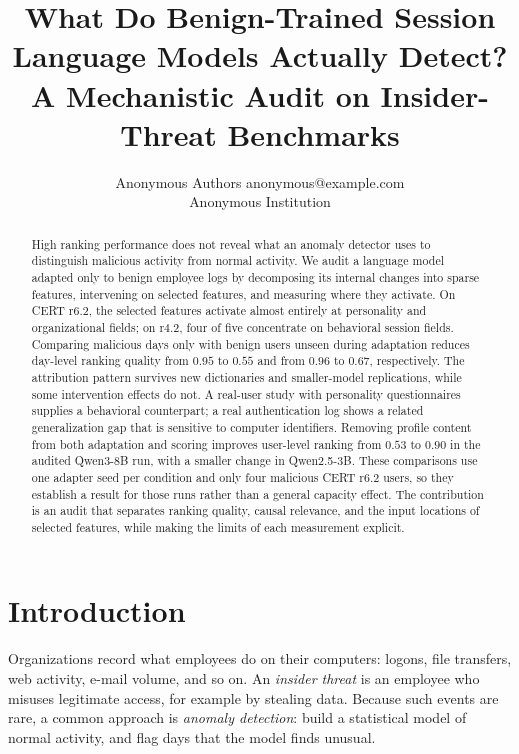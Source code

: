 \documentclass[10pt]{article} %
\title{What Do Benign-Trained Session Language Models Actually Detect? \\ A Mechanistic Audit on Insider-Threat Benchmarks}
\author{\name Anonymous Authors \email anonymous@example.com \\
\addr Anonymous Institution}
\begin{document}
\maketitle


\begin{abstract}
High ranking performance does not reveal what an anomaly detector uses
to distinguish malicious activity from normal activity. We audit a language
model adapted only to benign employee logs by decomposing its internal
changes into sparse features, intervening on selected features, and
measuring where they activate. On CERT r6.2, the selected features activate
almost entirely at personality and organizational fields; on r4.2, four of
five concentrate on behavioral session fields. Comparing malicious days
only with benign users unseen during adaptation reduces day-level ranking
quality from $0.95$ to $0.55$ and from $0.96$ to $0.67$, respectively.
The attribution pattern survives new dictionaries and smaller-model
replications, while some intervention effects do not. A real-user study
with personality questionnaires supplies a behavioral counterpart; a real
authentication log shows a related generalization gap that is sensitive
to computer identifiers. Removing profile content from both adaptation
and scoring improves user-level ranking from $0.53$ to $0.90$ in the
audited Qwen3-8B run, with a smaller change in Qwen2.5-3B. These comparisons
use one adapter seed per condition and only four malicious CERT r6.2
users, so they establish a result for those runs rather than a general
capacity effect. The contribution is an audit that separates ranking
quality, causal relevance, and the input locations of selected features,
while making the limits of each measurement explicit.
\end{abstract}

\section{Introduction}
\label{sec:intro}

Organizations record what employees do on their computers: logons, file
transfers, web activity, e-mail volume, and so on. An \emph{insider
threat} is an employee who misuses legitimate access, for example by
stealing data. Because such events are rare, a common approach is
\emph{anomaly detection}: build a statistical model of normal activity,
and flag days that the model finds unusual.
\end{document}
